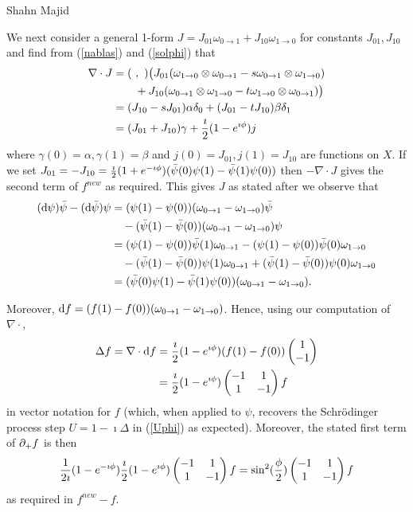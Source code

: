 \begin{artengenv}{Shahn Majid}
\begin{example}
We next consider a general 1-form $J=J_{01}\omega_{0\to 1}+J_{10}\omega_{1\to 0}$ for constants $J_{01},J_{10}$ and find from (\ref{nablas}) and (\ref{solphi}) that
\begin{align*}\nabla\cdot J&= (\ ,\ )\big(J_{01}(\omega_{1\to 0}\otimes\omega_{0\to 1}- s\omega_{0\to 1}\otimes\omega_{1\to 0})\\
&\qquad+ J_{10}(\omega_{0\to 1}\otimes\omega_{1\to 0}- t\omega_{1\to 0}\otimes\omega_{0\to 1})\big)\\
&=(J_{10}-sJ_{01})\alpha \delta_0+ (J_{01}-t J_{10})\beta\delta_1\\
&=(J_{01}+J_{10})\gamma+ {\imath\over 2}(1-e^{\imath\phi})j\end{align*}
where $\gamma(0)=\alpha, \gamma(1)=\beta$ and $j(0)=J_{01}, j(1)=J_{10}$ are functions on $X$. If we set $J_{01}=-J_{10}={\imath\over 2}(1+e^{-\imath\phi})(\bar\psi(0)\psi(1)-\bar\psi(1)\psi(0))$ then $-\nabla\cdot J$ gives the second term of $f^{new}$ as required. This gives $J$ as stated after we observe that
\begin{align*} ({\rm d}\psi)\bar\psi-({\rm d}\bar\psi)\psi&=(\psi(1)-\psi(0))(\omega_{0\to 1}-\omega_{1\to 0})\bar\psi\\
&\quad-(\bar\psi(1)-\bar\psi(0))(\omega_{0\to 1}-\omega_{1\to 0})\psi\\
&=(\psi(1)-\psi(0))\bar\psi(1)\omega_{0\to 1}-(\psi(1)-\psi(0))\bar\psi(0)\omega_{1\to 0}\\
&\quad-(\bar\psi(1)-\bar\psi(0))\psi(1)\omega_{0\to 1}+(\bar\psi(1)-\bar\psi(0))\psi(0)\omega_{1\to 0}\\
&=(\bar\psi(0)\psi(1)-\bar\psi(1)\psi(0))(\omega_{0\to 1}-\omega_{1\to 0}).\end{align*}


Moreover, ${\rm d} f=(f(1)-f(0))(\omega_{0\to 1}-\omega_{1\to 0})$. Hence, using our computation of $\nabla\cdot$, 
\begin{align*}
\Delta f=\nabla\cdot{\rm d} f&={\imath\over 2}(1-e^{\imath\phi})(f(1)-f(0))\begin{pmatrix}1\\-1\end{pmatrix}\\
&={\imath\over 2}(1-e^{\imath\phi})\begin{pmatrix}-1 & 1\\ 1 & -1\end{pmatrix}f
\end{align*}
in vector notation for $f$ (which, when applied to $\psi$, recovers the Schr\"odinger process step $U=1-\imath\Delta$ in (\ref{Uphi}) as expected). Moreover, the stated first term of ${\partial}_+f$ is then
\[ {1\over 2\imath}(1-e^{-\imath\phi}){\imath\over 2}(1-e^{\imath\phi})\begin{pmatrix}-1 & 1\\ 1 & -1\end{pmatrix}f=\sin^2({\phi\over 2})\begin{pmatrix}-1 & 1\\ 1 & -1\end{pmatrix}f\]
as required in $f^{new}-f$. \endproof \end{example}


\end{artengenv}
